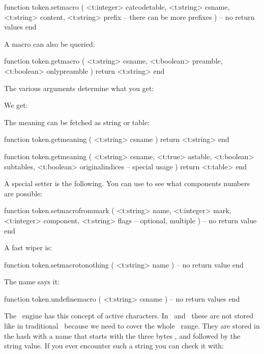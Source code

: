 function token.setmacro (
    <t:integer> catcodetable,
    <t:string>  csname,
    <t:string>  content,
    <t:string>  prefix
 -- there can be more prefixes
)
    -- no return values
end
\stoptyping

A macro can also be queried:

\starttyping[option=LUA]
function token.getmacro (
    <t:string>  csname,
    <t:boolean> preamble,
    <t:boolean> onlypreamble
)
    return <t:string>
end
\stoptyping

The various arguments determine what you get:

\startbuffer
\def\foo#1{foo: #1}

\stopbuffer

\typebuffer

We get:

\startlines
\getbuffer
\stoplines

The meaning can be fetched as string or table:

\starttyping[option=LUA]
function token.getmeaning (
    <t:string> csname
)
    return <t:string>
end

function token.getmeaning (
    <t:string>  csname,
    <t:true>    astable,
    <t:boolean> subtables,
    <t:boolean> originalindices -- special usage
)
    return <t:table>
end
\stoptyping

A special setter is the following. You can use  to
see what components numbers are possible:

\starttyping[option=LUA]
function token.setmacrofrommark (
    <t:string>  name,
    <t:integer> mark,
    <t:integer> component,
    <t:string>  flags -- optional, multiple
)
    -- no return value
end
\stoptyping

A fast wiper is:

\starttyping[option=LUA]
function token.setmacrotonothing (
    <t:string> name
)
    -- no return value
end
\stoptyping

The name says it:

\starttyping[option=LUA]
function token.undefinemacro ( <t:string> csname )
    -- no return values
end
\stoptyping

The \TEX\ engine has this concept of active characters. In \LUATEX\ and
\LUAMETATEX\ these are not stored like in traditional \TEX\ because we need to
cover the whole \UNICODE\ range. They are stored in the hash with a name that
starts with the three bytes ,  and  followed
by the  string value. If you ever encounter such a string you can check it
with:

